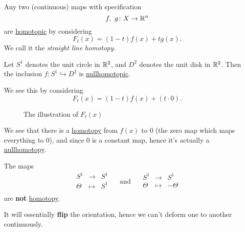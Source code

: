 \begin{eg}\label{eg:lec1:straight-line-homotopy}
	Any two (continuous) maps with specification
	\[
		f,\ g\colon X\to \mathbb{\MakeUppercase{R}}^n
	\]
	are \hyperref[def:homotopic]{homotopic} by considering
	\[
		F_{t}(x) = (1 - t)f(x) + t g(x).
	\]
	We call it the \emph{straight line homotopy}.
\end{eg}
\begin{eg}
	Let \(S^1\) denotes the unit circle in \(\mathbb{\MakeUppercase{R}} ^2\), and
	\(D^2\)  denotes the unit disk in \(\mathbb{\MakeUppercase{R}} ^2\). Then the inclusion
	\(f\colon S^1\hookrightarrow D^2\) is \hyperref[def:nullhomotopic]{nullhomotopic}.
\end{eg}
\begin{explanation}
	We see this by considering
	\[
		F_t(x) = (1 - t)f(x) + (t\cdot 0).
	\]
	\begin{figure}[H]
		\centering
		\caption{The illustration of \(F_{t}(x)\)}
		\label{fig:eg:homotopy}
	\end{figure}
	We see that there is a \hyperref[def:homotopy]{homotopy} from \(f(x)\) to \(0\) (the zero
	map which maps everything to \(0\)), and since \(0\) is a constant map, hence it's actually
	a \hyperref[def:nullhomotopic]{nullhomotopy}.
\end{explanation}
\begin{eg}
	The maps
	\[
		\begin{array}{ccc}
			S^1    & \to     & S^1 \\
			\Theta & \mapsto & S^1 \\
		\end{array}\quad \text{ and } \quad
		\begin{array}{ccc}
			S^1    & \to     & S^1     \\
			\Theta & \mapsto & -\Theta \\
		\end{array}
	\]
	are \textbf{not} \hyperref[def:homotopy]{homotopy}.
	\begin{remark}
		It will essentially \textbf{flip} the orientation, hence we can't deform one to another continuously.
	\end{remark}
\end{eg}

